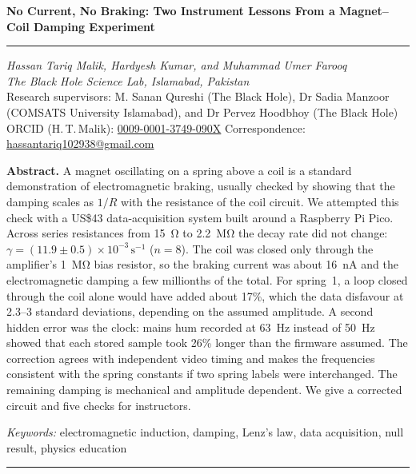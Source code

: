 \documentclass[12pt,a4paper]{article}
\begin{document}
\thispagestyle{plain}
\begin{center}
{\Large\bfseries No Current, No Braking: Two Instrument Lessons From a Magnet--Coil Damping Experiment\par}
\vspace{8pt}\rule{\linewidth}{0.4pt}\vspace{2pt}

\textit{Hassan Tariq Malik, Hardyesh Kumar, and Muhammad Umer Farooq}\\
\textit{The Black Hole Science Lab, Islamabad, Pakistan}\\
{\small Research supervisors: M. Sanan Qureshi (The Black Hole), Dr Sadia Manzoor (COMSATS University Islamabad), and Dr Pervez Hoodbhoy (The Black Hole)}\\[1pt]
{\small ORCID (H.\,T.\,Malik): \href{https://orcid.org/0009-0001-3749-090X}{0009-0001-3749-090X} \;\textperiodcentered\; Correspondence: \href{mailto:hassantariq102938@gmail.com}{hassantariq102938@gmail.com}}
\end{center}
\vspace{-2pt}
{\noindent\textbf{Abstract.} A magnet oscillating on a spring above a coil is a standard demonstration of electromagnetic braking, usually checked by showing that the damping scales as $1/R$ with the resistance of the coil circuit. We attempted this check with a US\$43 data-acquisition system built around a Raspberry Pi Pico. Across series resistances from \SI{15}{\ohm} to \SI{2.2}{\mega\ohm} the decay rate did not change: $\gamma = (11.9 \pm 0.5)\times10^{-3}\,\mathrm{s^{-1}}$ ($n = 8$). The coil was closed only through the amplifier's \SI{1}{\mega\ohm} bias resistor, so the braking current was about \SI{16}{nA} and the electromagnetic damping a few millionths of the total. For spring~1, a loop closed through the coil alone would have added about 17\%, which the data disfavour at 2.3--3 standard deviations, depending on the assumed amplitude. A second hidden error was the clock: mains hum recorded at \SI{63}{Hz} instead of \SI{50}{Hz} showed that each stored sample took 26\% longer than the firmware assumed. The correction agrees with independent video timing and makes the frequencies consistent with the spring constants if two spring labels were interchanged. The remaining damping is mechanical and amplitude dependent. We give a corrected circuit and five checks for instructors.

\hspace{0.5in}\textit{Keywords:} electromagnetic induction, damping, Lenz's law, data acquisition, null result, physics education\par}
\vspace{4pt}\noindent\rule{\linewidth}{0.4pt}
\vspace{2pt}
\end{document}
